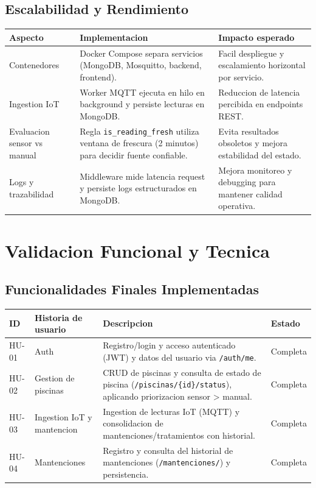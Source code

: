 \documentclass[11pt, a4paper]{article}
\begin{document}
\subsection{Escalabilidad y Rendimiento}
\begin{longtable}{@{} p{2.5cm} p{6.3cm} p{5.4cm} @{}}
  \toprule
  \textbf{Aspecto} & \textbf{Implementacion} & \textbf{Impacto esperado} \\
  \midrule
  Contenedores & Docker Compose separa servicios (MongoDB, Mosquitto, backend, frontend). & Facil despliegue y escalamiento horizontal por servicio. \\
  \midrule
  Ingestion IoT & Worker MQTT ejecuta en hilo en background y persiste lecturas en MongoDB. & Reduccion de latencia percibida en endpoints REST. \\
  \midrule
  Evaluacion sensor vs manual & Regla \texttt{is\_reading\_fresh} utiliza ventana de frescura (2 minutos) para decidir fuente confiable. & Evita resultados obsoletos y mejora estabilidad del estado. \\
  \midrule
  Logs y trazabilidad & Middleware mide latencia request y persiste logs estructurados en MongoDB. & Mejora monitoreo y debugging para mantener calidad operativa. \\
  \bottomrule
\end{longtable}

\section{Validacion Funcional y Tecnica}

\subsection{Funcionalidades Finales Implementadas}
\begin{longtable}{@{} p{1cm} p{4.2cm} p{9cm} p{2cm} @{}}
  \toprule
  \textbf{ID} & \textbf{Historia de usuario} & \textbf{Descripcion} & \textbf{Estado} \\
  \midrule
  HU-01 & Auth & Registro/login y acceso autenticado (JWT) y datos del usuario via \texttt{/auth/me}. & Completa \\
  \midrule
  HU-02 & Gestion de piscinas & CRUD de piscinas y consulta de estado de piscina (\texttt{/piscinas/\{id\}/status}), aplicando priorizacion sensor > manual. & Completa \\
  \midrule
  HU-03 & Ingestion IoT y mantencion & Ingestion de lecturas IoT (MQTT) y consolidacion de mantenciones/tratamientos con historial. & Completa \\
  \midrule
  HU-04 & Mantenciones & Registro y consulta del historial de mantenciones (\texttt{/mantenciones/}) y persistencia. & Completa \\
  \bottomrule
\end{longtable}
\end{document}

